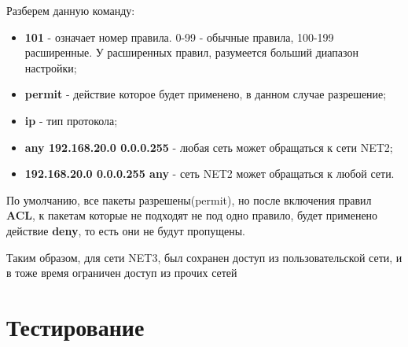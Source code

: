 Разберем данную команду:
\begin{itemize}
\item \textbf{101} - означает номер правила. 0-99 - обычные правила, 100-199 расширенные. У расширенных правил, разумеется больший диапазон настройки;
\item \textbf{permit} - действие которое будет применено, в данном случае разрешение;
\item \textbf{ip} - тип протокола;
\item \textbf{any 192.168.20.0 0.0.0.255} - любая сеть может обращаться к сети NET2;
\item \textbf{192.168.20.0 0.0.0.255 any} - сеть NET2 может обращаться к любой сети.
\end{itemize}
По умолчанию, все пакеты разрешены(permit), но после включения правил \textbf{ACL}, к пакетам которые не подходят не под одно правило, будет применено действие \textbf{deny}, то есть они не будут пропущены.

Таким образом, для сети NET3, был сохранен доступ из пользовательской сети, и в тоже время ограничен доступ из прочих сетей


\section{Тестирование}
